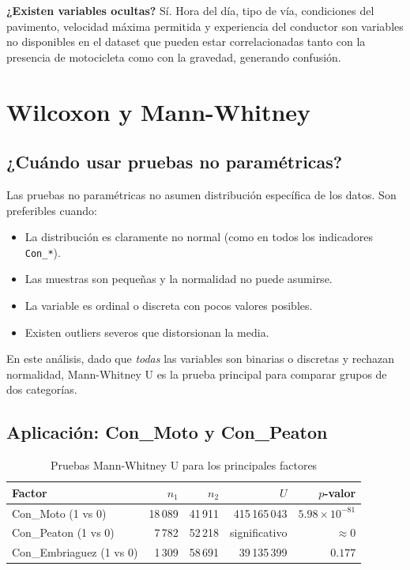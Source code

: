 \documentclass[11pt,a4paper]{article}
\begin{document}
\textbf{¿Existen variables ocultas?} Sí. Hora del día, tipo de vía, condiciones del
pavimento, velocidad máxima permitida y experiencia del conductor son variables no
disponibles en el dataset que pueden estar correlacionadas tanto con la presencia de
motocicleta como con la gravedad, generando confusión.

\section{Wilcoxon y Mann-Whitney}

\subsection{¿Cuándo usar pruebas no paramétricas?}

Las pruebas no paramétricas no asumen distribución específica de los datos. Son preferibles
cuando:
\begin{itemize}
  \item La distribución es claramente no normal (como en todos los indicadores
        \texttt{Con\_*}).
  \item Las muestras son pequeñas y la normalidad no puede asumirse.
  \item La variable es ordinal o discreta con pocos valores posibles.
  \item Existen outliers severos que distorsionan la media.
\end{itemize}

En este análisis, dado que \textit{todas} las variables son binarias o discretas y
rechazan normalidad, Mann-Whitney U es la prueba principal para comparar grupos de dos
categorías.

\subsection{Aplicación: Con\_Moto y Con\_Peaton}

\begin{table}[H]
\centering
\caption{Pruebas Mann-Whitney U para los principales factores}
\label{tab:mannwhitney}
\begin{tabular}{@{}lrrrr@{}}
\toprule
Factor & $n_1$ & $n_2$ & $U$ & $p$-valor \\
\midrule
Con\_Moto (1 vs 0)   & 18\,089 & 41\,911 & 415\,165\,043 & $5.98 \times 10^{-81}$ \\
Con\_Peaton (1 vs 0) & 7\,782  & 52\,218 & significativo  & $\approx 0$ \\
Con\_Embriaguez (1 vs 0) & 1\,309 & 58\,691 & 39\,135\,399 & $0.177$ \\
\bottomrule
\end{tabular}
\end{table}
\end{document}
